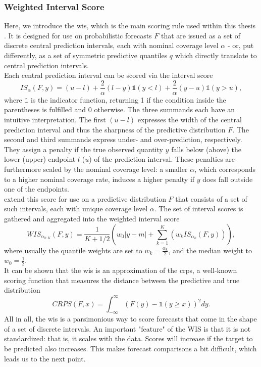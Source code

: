 \subsubsection{Weighted Interval Score}
Here, we introduce the \ac{wis}, which is the main scoring rule used within this thesis \cite{bracher_evaluating_2021}. It is designed for use on probabilistic forecasts \cite{european_covid-19_forecast_hub_european_2021} $F$ that are issued as a set of discrete central prediction intervals, each with nominal coverage level $\alpha$ - or, put differently, as a set of symmetric predictive quantiles $q$ which directly translate to central prediction intervals. \\
Each central prediction interval can be scored via the interval score \citep{gneiting_strictly_2007}
\begin{equation}
IS_{\alpha}(F, y) = (u-l) + \frac{2}{\alpha}(l - y)\mathbb{1}(y < l) + \frac{2}{\alpha}(y - u)\mathbb{1}(y > u),
\end{equation}
where $\mathbb{1}$ is the indicator function, returning 1 if the condition inside the parentheses is fulfilled and 0 otherwise. The three summands each have an intuitive interpretation. The first $(u-l)$ expresses the width of the central prediction interval and thus the sharpness of the predictive distribution $F$. The second and third summands express under- and over-prediction, respectively. They assign a penalty if the true observed quantity $y$ falls below (above) the lower (upper) endpoint $l$ ($u$) of the prediction interval. These penalties are furthermore scaled by the nominal coverage level: a smaller $\alpha$, which corresponds to a higher nominal coverage rate, induces a higher penalty if $y$ does fall outside one of the endpoints. \\
\cite{bracher_evaluating_2021} extend this score for use on a predictive distribution $F$ that consists of a set of such intervals, each with unique coverage level $\alpha$. The set of interval scores is gathered and aggregated into the weighted interval score
\begin{equation}
WIS_{\alpha_{0:K}}(F,y) = \frac{1}{K + 1/2}\left(w_{0}|y-m| + \sum_{k=1}^{K}\left(w_k IS_{\alpha_{k}}(F, y)\right)\right),
\end{equation}
where usually the quantile weights are set to $w_k = \frac{\alpha_{k}}{2}$, and the median weight to $w_{0} = \frac{1}{2}$.\\
It can be shown that the \ac{wis} is an approximation of the \ac{crps}, a well-known scoring function that measures the distance between the predictive and true distribution 
\begin{equation}
CRPS(F, x) = \int_{-\infty}^{\infty} \left(F(y) - \mathbb{1}(y \geq x) \right)^2dy.
\end{equation}
All in all, the \ac{wis} is a parsimonious way to score forecasts that come in the shape of a set of discrete intervals.
An important "feature" of the WIS is that it is not standardized: that is, it scales with the data. Scores will increase if the target to be predicted also increases. This makes forecast comparisons a bit difficult, which leads us to the next point.
